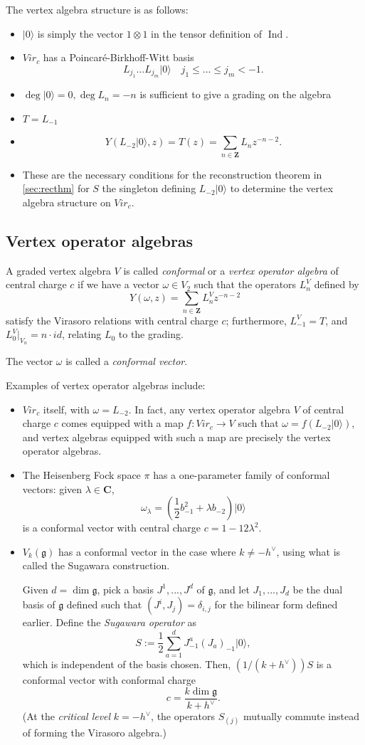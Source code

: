\documentclass{article}
\newcommand{\CC}{\mathbold{C}}
\newcommand{\ZZ}{\mathbold{Z}}
\newcommand{\vac}{|0\rangle}
\newcommand{\gf}{\mathfrak{g}}
\DeclareMathOperator{\Ind}{Ind}
\begin{document}
The vertex algebra structure is as follows:
\begin{itemize}
\item $\vac$ is simply the vector $1 \otimes 1$ in the tensor definition of $\Ind$.
\item $Vir_c$ has a Poincaré-Birkhoff-Witt basis
\[L_{j_1}...L_{j_m}\vac \quad j_1\le ... \le j_m < -1. \]
\item $\deg \vac=0, \deg L_n=-n$ is sufficient to give a grading on the algebra
\item $T=L_{-1}$
\item \[Y(L_{-2}\vac,z)=T(z)=\sum_{n \in \ZZ}L_nz^{-n-2}. \]
\item These are the necessary conditions for the reconstruction theorem in \ref{sec:recthm} for $S$ the singleton defining $L_{-2}\vac$ to determine the vertex algebra structure on $Vir_c$.
\end{itemize}

\subsection{Vertex operator algebras}
A graded vertex algebra $V$ is called \textit{conformal} or a \textit{vertex operator algebra} of central charge $c$ if we have a vector $\omega \in V_2$ such that the operators $L^V_n$ defined by
\[Y(\omega,z)=\sum_{n \in \ZZ}L^V_n z^{-n-2} \]
satisfy the Virasoro relations with central charge $c$; furthermore, $L^V_{-1}=T$, and $L^V_{0}|_{V_n}=n\cdot id$, relating $L_0$ to the grading.

The vector $\omega$ is called a \textit{conformal vector}.

Examples of vertex operator algebras include:
\begin{itemize}
\item $Vir_c$ itself, with $\omega=L_{-2}$.  In fact, any vertex operator algebra $V$ of central charge $c$ comes equipped with a map $f:Vir_c \rightarrow V$ such that $\omega=f(L_{-2}\vac)$, and vertex algebras equipped with such a map are precisely the vertex operator algebras.
\item The Heisenberg Fock space $\pi$ has a one-parameter family of conformal vectors: given $\lambda \in \CC$,
\[\omega_\lambda=\left(\frac{1}{2}b_{-1}^2+\lambda b_{-2}\right)\vac \]
is a conformal vector with central charge $c=1-12\lambda^2$.
\item $V_k(\gf)$ has a conformal vector in the case where $k \ne -h^\vee$, using what is called the Sugawara construction.

Given $d=\dim \gf$, pick a basis $J^1,...,J^d$ of $\gf$, and let $J_1,...,J_d$ be the dual basis of $\gf$ defined such that $(J^i,J_j)=\delta_{i,j}$ for the bilinear form defined earlier.  Define the \textit{Sugawara operator} as
\[S:=\frac{1}{2} \sum_{a=1}^d J^a_{-1}(J_a)_{-1} \vac, \]
which is independent of the basis chosen.  Then, $(1/(k+h^\vee))S$ is a conformal vector with conformal charge
\[c=\frac{k \dim \gf}{k+h^\vee}. \]
(At the \textit{critical level} $k=-h^\vee$, the operators $S_{(j)}$ mutually commute instead of forming the Virasoro algebra.)
\end{itemize}
\end{document}
